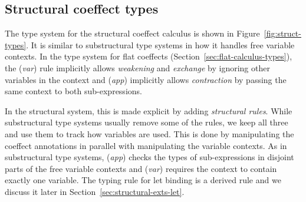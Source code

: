 
\subsection{Structural coeffect types}
\label{sec:struct-calculus-types}

The type system for the structural coeffect calculus is shown in Figure~\ref{fig:struct-types}.
It is similar to substructural type systems
\cite{substruct-attpl-intro} in how it handles free variable contexts. In the type system for
flat coeffects (Section~\ref{sec:flat-calculus-types}), the (\emph{var}) rule implicitly allows
\emph{weakening} and \emph{exchange} by ignoring other variables in the context and
(\emph{app}) implicitly allows \emph{contraction} by passing the same context to both sub-expressions.

In the structural system, this is made explicit by adding \emph{structural rules}.
While substructural type systems usually remove some of the rules, we keep all three and
use them to track how variables are used. This is done by manipulating the coeffect annotations
in parallel with manipulating the variable contexts. As in substructural type systems, (\emph{app})
checks the types of sub-expressions in disjoint parts of the free variable contexts and
(\emph{var}) requires the context to contain exactly one variable. The typing rule for let binding
is a derived rule and we discuss it later in Section~\ref{sec:structural-exts-let}.


